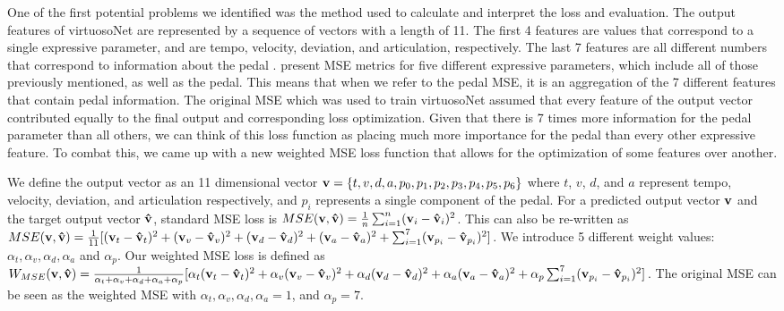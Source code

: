 One of the first potential problems we identified was the method used to calculate and interpret the loss and evaluation. The output features of virtuosoNet are represented by a sequence of vectors with a length of 11. The first 4 features are values that correspond to a single expressive parameter, and are tempo, velocity, deviation, and articulation, respectively. The last 7 features are all different numbers that correspond to information about the pedal \cite{jeong2019score}. \citet{jeong2019virtuosonet} present MSE metrics for five different expressive parameters, which include all of those previously mentioned, as well as the pedal. This means that when we refer to the pedal MSE, it is an aggregation of the 7 different features that contain pedal information. The original MSE which was used to train virtuosoNet assumed that every feature of the output vector contributed equally to the final output and corresponding loss optimization. Given that there is 7 times more information for the pedal parameter than all others, we can think of this loss function as placing much more importance for the pedal than every other expressive feature. To combat this, we came up with a new weighted MSE loss function that allows for the optimization of some features over another. 

\newcommand{\rvec}[1]{\mb{#1}}

\newcommand{\vn}{\rvec{v}}
\newcommand{\vh}{\rvec{\hat{v}}}

\newcommand{\df}[1]{(\vn_{#1} - \vh_{#1})^2}

\newcommand{\al}[1]{\alpha_{#1}}

We define the output vector as an 11 dimensional vector $\rvec{v} = \{t, v, d, a, p_0, p_1, p_2, p_3, p_4, p_5, p_6\}$ where $t$, $v$, $d$, and $a$ represent tempo, velocity, deviation, and articulation respectively, and $p_i$ represents a single component of the pedal. For a predicted output vector $\vn$ and the target output vector $\vh$, standard MSE loss is $MSE(\vn, \vh) = \frac{1}{n}\sum_{i=1}^{n}(\vn_i - \vh_i)^2$. This can also be re-written as $MSE(\vn, \vh) = \frac{1}{11}[\df{t} + \df{v} + \df{d} + \df{a} + \sum_{i=1}^{7}(\vn_{p_{i}} - \vh_{p_{i}})^2]$. We introduce 5 different weight values: $\al{t}, \al{v}, \al{d}, \al{a}$ and $\al{p}$. Our weighted MSE loss is defined as $W_{MSE}(\vn, \vh) = \frac{1}{\al{t} + \al{v} + \al{d} + \al{a} + \al{p}}[\al{t}\df{t} + \al{v}\df{v} + \al{d}\df{d} + \al{a}\df{a} + \al{p}\sum_{i=1}^{7}(\vn_{p_{i}} - \vh_{p_{i}})^2 ]$. The original MSE can be seen as the weighted MSE with $\al{t}, \al{v}, \al{d}, \al{a} = 1$, and $\al{p} = 7$. 

